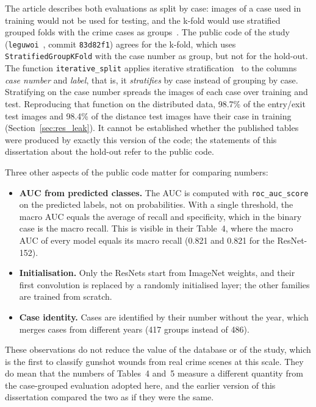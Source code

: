 The article describes both evaluations as split by case: images of a case used in training would not be used for testing, and the k-fold would use stratified grouped folds with the crime cases as groups~\cite{Lira2025deep}. The public code of the study (\texttt{leguwoi}~\cite{leguwoi}, commit \texttt{83d82f1}) agrees for the k-fold, which uses \texttt{StratifiedGroupKFold} with the case number as group, but not for the hold-out. The function \texttt{iterative\_split} applies iterative stratification~\cite{sechidis2011stratification} to the columns \emph{case number} and \emph{label}, that is, it \emph{stratifies} by case instead of grouping by case. Stratifying on the case number spreads the images of each case over training and test. Reproducing that function on the distributed data, 98.7\% of the entry/exit test images and 98.4\% of the distance test images have their case in training (Section~\ref{sec:res_leak}). It cannot be established whether the published tables were produced by exactly this version of the code; the statements of this dissertation about the hold-out refer to the public code.

Three other aspects of the public code matter for comparing numbers:
\begin{itemize}
    \item \textbf{AUC from predicted classes.} The AUC is computed with \texttt{roc\_auc\_score} on the predicted labels, not on probabilities. With a single threshold, the macro AUC equals the average of recall and specificity, which in the binary case is the macro recall. This is visible in their Table~4, where the macro AUC of every model equals its macro recall (0.821 and 0.821 for the ResNet-152).
    \item \textbf{Initialisation.} Only the ResNets start from ImageNet weights, and their first convolution is replaced by a randomly initialised layer; the other families are trained from scratch.
    \item \textbf{Case identity.} Cases are identified by their number without the year, which merges cases from different years (417 groups instead of 486).
\end{itemize}
These observations do not reduce the value of the database or of the study, which is the first to classify gunshot wounds from real crime scenes at this scale. They do mean that the numbers of Tables~4 and~5 measure a different quantity from the case-grouped evaluation adopted here, and the earlier version of this dissertation compared the two as if they were the same.

